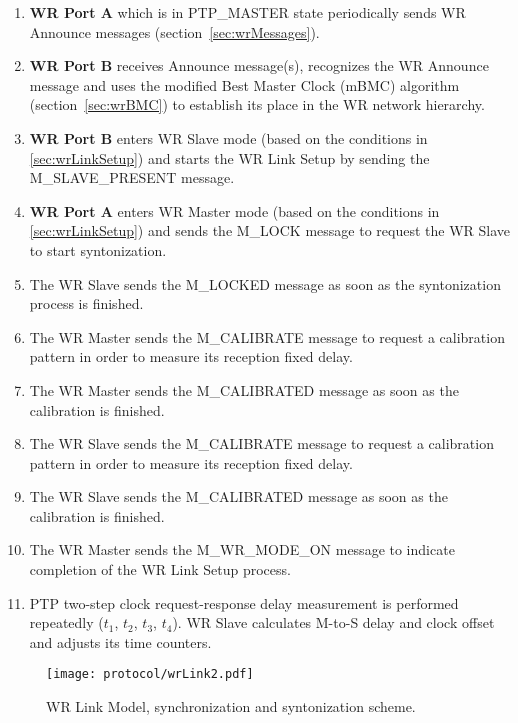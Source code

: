 \begin{enumerate}
\item \textbf{WR Port A} which is in PTP\_MASTER state periodically sends WR Announce messages
      (section~\ref{sec:wrMessages}).
\item \textbf{WR Port B} receives Announce message(s), recognizes the WR Announce message and 
      uses the modified Best Master Clock (mBMC) algorithm (section~\ref{sec:wrBMC}) to establish its
      place in the WR network hierarchy.
\item \textbf{WR Port B} enters WR Slave mode (based on the conditions in 
      \ref{sec:wrLinkSetup}) and starts the WR Link Setup by sending the M\_SLAVE\_PRESENT message.
\item \textbf{WR Port A} enters WR Master mode (based on the conditions in 
      \ref{sec:wrLinkSetup}) and sends the M\_LOCK message to request the WR Slave to start
      syntonization.
\item The WR Slave sends the M\_LOCKED message as soon as the syntonization process is 
      finished.
\item The WR Master sends the M\_CALIBRATE message to request a calibration pattern in order to 
      measure its reception fixed delay.
\item The WR Master sends the M\_CALIBRATED message as soon as the calibration is 
      finished.
\item The WR Slave sends the M\_CALIBRATE message to request a calibration pattern in order to 
      measure its reception fixed delay.
\item The WR Slave sends the M\_CALIBRATED message as soon as the calibration is 
      finished.
\item The WR Master sends the M\_WR\_MODE\_ON message to indicate completion of  the WR
      Link Setup process.
\item PTP two-step clock request-response delay measurement is performed repeatedly ($t_{1}$,
      $t_{2}$, $t_{3}$, $t_{4}$). WR Slave calculates M-to-S delay and clock offset and adjusts its
      time counters.
\end{enumerate}


\begin{figure}[!t]
\centering
\texttt{[image: protocol/wrLink2.pdf]}
\caption{WR Link  Model, synchronization and syntonization scheme.}
\label{fig:wrLink}
\end{figure}



